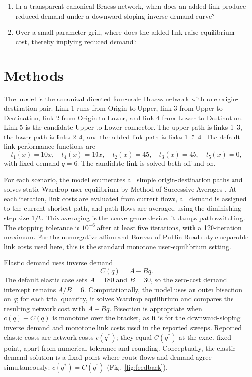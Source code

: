 \documentclass{article}
\begin{document}
\begin{enumerate}
  \item In a transparent canonical Braess network, when does an added link produce reduced demand under a downward-sloping inverse-demand curve?
  \item Over a small parameter grid, where does the added link raise equilibrium cost, thereby implying reduced demand?
\end{enumerate}

\section{Methods}

The model is the canonical directed four-node Braess network with one origin-destination pair. Link 1 runs from Origin to Upper, link 3 from Upper to Destination, link 2 from Origin to Lower, and link 4 from Lower to Destination. Link 5 is the candidate Upper-to-Lower connector. The upper path is links 1--3, the lower path is links 2--4, and the added-link path is links 1--5--4. The default link performance functions are
\[
t_1(x)=10x,\quad t_4(x)=10x,\quad t_2(x)=45,\quad t_3(x)=45,\quad t_5(x)=0,
\]
with fixed demand \(q=6\). The candidate link is solved both off and on.

For each scenario, the model enumerates all simple origin-destination paths and solves static Wardrop user equilibrium by Method of Successive Averages \citep{sheffi1985urban}. At each iteration, link costs are evaluated from current flows, all demand is assigned to the current shortest path, and path flows are averaged using the diminishing step size \(1/k\). This averaging is the convergence device: it damps path switching. The stopping tolerance is \(10^{-6}\) after at least five iterations, with a 120-iteration maximum. For the nonnegative affine and Bureau of Public Roads-style separable link costs used here, this is the standard monotone user-equilibrium setting.

Elastic demand uses inverse demand
\[
C(q)=A-Bq.
\]
The default elastic case sets \(A=180\) and \(B=30\), so the zero-cost demand intercept remains \(A/B=6\). Computationally, the model uses an outer bisection on \(q\); for each trial quantity, it solves Wardrop equilibrium and compares the resulting network cost with \(A-Bq\). Bisection is appropriate when \(c(q)-C(q)\) is monotone over the bracket, as it is for the downward-sloping inverse demand and monotone link costs used in the reported sweeps. Reported elastic costs are network costs \(c(q^*)\); they equal \(C(q^*)\) at the exact fixed point, apart from numerical tolerance and rounding. Conceptually, the elastic-demand solution is a fixed point where route flows and demand agree simultaneously: \(c(q^*)=C(q^*)\) (Fig.~\ref{fig:feedback}).
\end{document}
